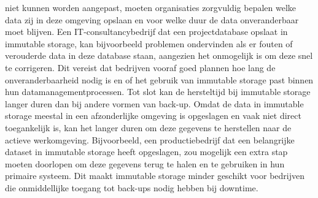 niet kunnen worden aangepast, moeten organisaties zorgvuldig bepalen welke data zij in deze omgeving opslaan en voor welke duur de data onveranderbaar moet blijven. Een IT-consultancybedrijf dat een projectdatabase opslaat in immutable storage, kan bijvoorbeeld problemen ondervinden als er fouten of verouderde data in deze database staan, aangezien het onmogelijk is om deze snel te corrigeren. Dit vereist dat bedrijven vooraf goed plannen hoe lang de onveranderbaarheid nodig is en of het gebruik van immutable storage past binnen hun datamanagementprocessen. Tot slot kan de hersteltijd bij immutable storage langer duren dan bij andere vormen van back-up. Omdat de data in immutable storage meestal in een afzonderlijke omgeving is opgeslagen en vaak niet direct toegankelijk is, kan het langer duren om deze gegevens te herstellen naar de actieve werkomgeving. Bijvoorbeeld, een productiebedrijf dat een belangrijke dataset in immutable storage heeft opgeslagen, zou mogelijk een extra stap moeten doorlopen om deze gegevens terug te halen en te gebruiken in hun primaire systeem. Dit maakt immutable storage minder geschikt voor bedrijven die onmiddellijke toegang tot back-ups nodig hebben bij downtime.